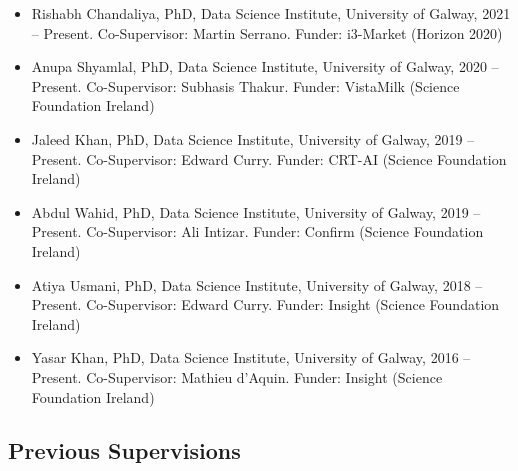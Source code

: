 \documentclass[10pt,a4paper]{res} %
\begin{document}
\begin{resume}
\begin{itemize} \itemsep -2pt
\item Rishabh Chandaliya, PhD, Data Science Institute, University of Galway, 2021 -- Present. Co-Supervisor: Martin Serrano. Funder: i3-Market (Horizon 2020)
\item Anupa Shyamlal, PhD, Data Science Institute, University of Galway, 2020 -- Present. Co-Supervisor: Subhasis Thakur. Funder: VistaMilk (Science Foundation Ireland)
\item Jaleed Khan, PhD, Data Science Institute, University of Galway, 2019 -- Present. Co-Supervisor: Edward Curry. Funder: CRT-AI (Science Foundation Ireland)
\item Abdul Wahid, PhD, Data Science Institute, University of Galway, 2019 -- Present. Co-Supervisor: Ali Intizar. Funder: Confirm (Science Foundation Ireland)
\item Atiya Usmani, PhD, Data Science Institute, University of Galway, 2018 -- Present. Co-Supervisor: Edward Curry. Funder: Insight (Science Foundation Ireland)
\item Yasar Khan, PhD, Data Science Institute, University of Galway, 2016 -- Present. Co-Supervisor: Mathieu d'Aquin. Funder: Insight (Science Foundation Ireland)
\end{itemize}

\subsection*{Previous Supervisions}


\end{resume}
\end{document}
